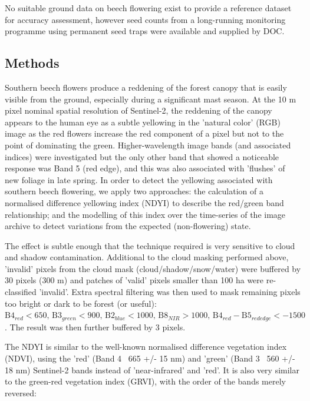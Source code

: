 \documentclass[remotesensing,article,submit,moreauthors,pdftex]{Definitions/mdpi}
\begin{document}
No suitable ground data on beech flowering exist to provide a reference dataset for accuracy assessment, however seed counts from a long-running monitoring programme using permanent seed traps \citep{Elliott2016} were available and supplied by DOC.

\subsection{Methods}
Southern beech flowers produce a reddening of the forest canopy that is easily visible from the ground, especially during a significant
mast season. At the 10 m pixel nominal spatial
resolution of Sentinel-2, the reddening of the canopy appears to the human eye as a subtle yellowing in the 'natural color' (RGB) image as the red flowers
increase the red component of a pixel but not to the point of dominating the green. Higher-wavelength image bands (and associated indices) were investigated but the only other band that showed a noticeable response was Band 5 (red edge), and this was also associated with 'flushes' of new foliage in late spring. In order to detect the yellowing associated with southern beech flowering, we apply two
approaches: the calculation of a normalised difference yellowing index (NDYI) to describe the red/green band relationship; and the modelling of this index over the
time-series of the image archive to detect variations from the expected (non-flowering) state.

The effect is subtle enough that the technique required is very sensitive to cloud and shadow contamination. Additional to the cloud masking performed above, 'invalid' pixels from the cloud mask (cloud/shadow/snow/water) were buffered by 30 pixels (300 m) and patches of 'valid' pixels smaller than 100 ha were re-classified 'invalid'. Extra spectral filtering was then used to mask remaining pixels too bright or dark to be forest (or useful): $\text{B}4_{red} < 650\text{, B}3_{green} < 900\text{, B}2_{blue} < 1000\text{, B}8_{NIR} > 1000\text{, B}4_{red} - \text{B}5_{red edge} < -1500$. The result was then further buffered by 3 pixels.

The NDYI is similar to the well-known normalised difference vegetation index (NDVI)\citep{Rouse1974}, using the 'red' (Band 4 ~665 +/- 15 nm) and
'green' (Band 3 ~560 +/- 18 nm) Sentinel-2 bands instead of 'near-infrared' and 'red'. It is also very similar to the green-red vegetation index (GRVI)\citep{Tucker1979,Motohka2010}, with the order of the bands merely reversed:
\end{document}
